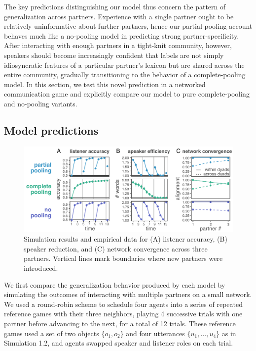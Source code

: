 The key predictions distinguishing our model thus concern the pattern of generalization across partners.
Experience with a single partner ought to be relatively uninformative about further partners, hence our partial-pooling account behaves much like a no-pooling model in predicting strong partner-specificity.
After interacting with enough partners in a tight-knit community, however, speakers should become increasingly confident that labels are not simply idiosyncratic features of a particular partner's lexicon but are shared across the entire community, gradually transitioning to the behavior of a complete-pooling model.
In this section, we test this novel prediction in a networked communication game and explicitly compare our model to pure complete-pooling and no-pooling variants.

\subsection{Model predictions}

\begin{figure}
\includegraphics[scale=1.05]{./figures/sec3-model_results.pdf}
\caption{Simulation results and empirical data for (A) listener accuracy, (B) speaker reduction, and (C) network convergence across three partners. Vertical lines mark boundaries where new partners were introduced.}
\label{fig:results}
\end{figure}

We first compare the generalization behavior produced by each model by simulating the outcomes of interacting with multiple partners on a small network. 
We used a round-robin scheme to schedule four agents into a series of repeated reference games with their three neighbors, playing 4 successive trials with one partner before advancing to the next, for a total of 12 trials.
These reference games used a set of two objects $\{o_1, o_2\}$ and four utterances $\{u_1, \dots, u_4\}$ as in Simulation 1.2, and agents swapped speaker and listener roles on each trial.

